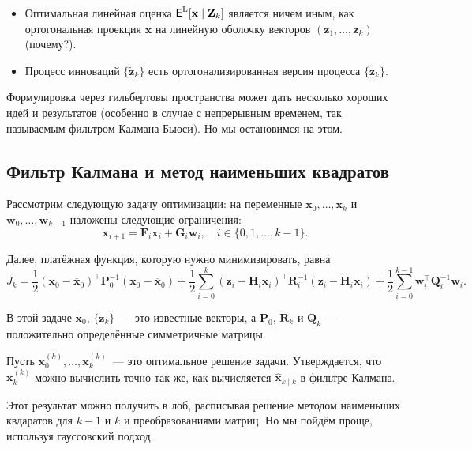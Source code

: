 \begin{leftbar}
\begin{small}
\begin{itemize}
		\item Оптимальная линейная оценка \(\E^{\mathrm{L}}[\mathbf{x} \mid 
		\mathbf{Z}_{k}]\) является ничем иным, как ортогональная проекция
		\(\mathbf{x}\) на линейную оболочку векторов \((\mathbf{z}_{1}, \ldots, 
		\mathbf{z}_{k})\) (почему?).
		
		\item Процесс инноваций \(\{\tilde{\mathbf{z}}_{k}\}\) есть 
		ортогонализированная версия процесса \(\{\mathbf{z}_{k}\}\).
	\end{itemize}

	Формулировка через гильбертовы пространства может дать несколько хороших 
	идей и результатов (особенно в случае с непрерывным временем, так 
	называемым фильтром Калмана-Бьюси). Но мы остановимся на этом.
\end{small}
\end{leftbar}

\subsection{Фильтр Калмана и метод наименьших квадратов}
Рассмотрим следующую задачу оптимизации: на переменные 
\(\mathbf{x}_{0}, \ldots, \mathbf{x}_{k}\) и \(\mathbf{w}_{0}, \ldots, 
\mathbf{w}_{k - 1}\) наложены следующие ограничения:
\[
	\mathbf{x}_{i + 1} = \mathbf{F}_{i}\mathbf{x}_{i} + 
	\mathbf{G}_{i}\mathbf{w}_{i}, \quad i \in \{0, 1, \ldots, k - 1\}.
\]

Далее, платёжная функция, которую нужно минимизировать, равна
\[
	J_{k} = \frac{1}{2}(\mathbf{x}_{0} - \overline{\mathbf{x}}_{0})^{\top} 
	\mathbf{P}_{0}^{-1}(\mathbf{x}_{0} - \overline{\mathbf{x}}_{0}) + 
	\frac{1}{2}\sum_{i = 0}^{k}(\mathbf{z}_{i} - \mathbf{H}_{i} 
	\mathbf{x}_{i})^{\top}\mathbf{R}_{i}^{-1}(\mathbf{z}_{i} - \mathbf{H}_{i} 
	\mathbf{x}_{i}) + \frac{1}{2}\sum_{i = 0}^{k - 
	1}\mathbf{w}_{i}^{\top}\mathbf{Q}_{i}^{-1}\mathbf{w}_{i}.
\]

В этой задаче \(\overline{\mathbf{x}}_{0}\), \(\{\mathbf{z}_{k}\}\)~--- это 
известные векторы, а \(\mathbf{P}_{0}\), \(\mathbf{R}_{k}\) и 
\(\mathbf{Q}_{k}\)~--- положительно определённые симметричные матрицы.

Пусть \(\mathbf{x}_{0}^{(k)}, \ldots, \mathbf{x}_{k}^{(k)}\)~--- это 
оптимальное решение задачи. Утверждается, что \(\mathbf{x}_{k}^{(k)}\) можно 
вычислить точно так же, как вычисляется \(\hat{\mathbf{x}}_{k \mid k}\) в 
фильтре Калмана.

Этот результат можно получить в лоб, расписывая решение методом наименьших 
квдаратов для \(k - 1\) и \(k\) и преобразованиями матриц. Но мы пойдём проще, 
используя гауссовский подход.

